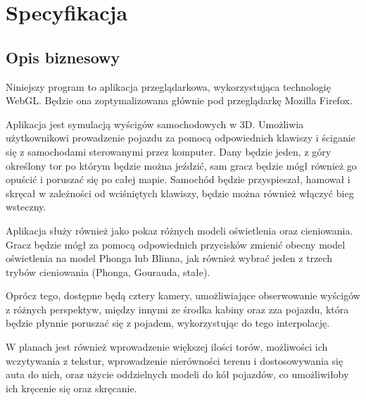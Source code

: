 \documentclass[11pt]{article}
\let\Oldsection\section
\renewcommand{\section}{\FloatBarrier\Oldsection}
\let\Oldsubsection\subsection
\renewcommand{\subsection}{\FloatBarrier\Oldsubsection}
\begin{document}
\begin{table}[!h]
\centering
\def\arraystretch{2}%
\caption{Lista zmian}

\end{table}


\newpage


\section{Specyfikacja}
\subsection{Opis biznesowy}

\par Niniejszy program to aplikacja przeglądarkowa, wykorzystująca technologię WebGL. Będzie ona zoptymalizowana głównie pod przeglądarkę Mozilla Firefox. 
\par Aplikacja jest symulacją wyścigów samochodowych w 3D. Umożliwia użytkownikowi prowadzenie pojazdu za pomocą odpowiednich klawiszy i ściganie się z samochodami sterowanymi przez komputer. Dany będzie jeden, z góry określony tor po którym będzie można jeździć, sam gracz będzie mógł również go opuścić i poruszać się po całej mapie. Samochód będzie przyspieszał, hamował i skręcał w zależności od wciśniętych klawiszy, będzie można również włączyć bieg wsteczny. 
\par Aplikacja służy również jako pokaz różnych modeli oświetlenia oraz cieniowania. Gracz będzie mógł za pomocą odpowiednich przycisków zmienić obecny model oświetlenia na model Phonga lub Blinna, jak również wybrać jeden z trzech trybów cieniowania (Phonga, Gourauda, stałe). 
\par Oprócz tego, dostępne będą cztery kamery, umożliwiające obserwowanie wyścigów z różnych perspektyw, między innymi ze środka kabiny oraz zza pojazdu, która będzie płynnie poruszać się z pojadem, wykorzystując do tego interpolację.
\par W planach jest również wprowadzenie większej ilości torów, możliwości ich wczytywania z tekstur, wprowadzenie nierówności terenu i dostosowywania się auta do nich, oraz użycie oddzielnych modeli do kół pojazdów, co umożliwiłoby ich kręcenie się oraz skręcanie.
\end{document}
